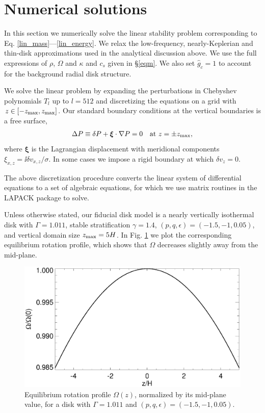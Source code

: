 \section{Numerical solutions}\label{numerical}
In this section we numerically solve the linear stability problem
corresponding to Eq. \ref{lin_mass}---\ref{lin_energy}. 
We relax the  low-frequency, nearly-Keplerian and thin-disk 
approximations used in the analytical discussion above. We 
use the full expressions of $\rho$, $\Omega$ and 
$\kappa$ and $c_s$ given in \S\ref{eqm}. We also set $\hat{g}_c=1$ to  
account for the background radial disk structure.  

We solve the linear problem by expanding the
perturbations in Chebyshev polynomials $T_l$ up to $l=512$
and discretizing the equations on a grid with
$z\in[-z_\mathrm{max},z_\mathrm{max}]$. Our standard boundary conditions at the vertical
boundaries is a free surface, 
\begin{align}
  \Delta P \equiv \delta P + \bm{\xi}\cdot\nabla P= 0 \quad \text{at } z=\pm z_\mathrm{max},
\end{align}
where $\bm{\xi}$ is the Lagrangian displacement with meridional 
components $\xi_{x,z} = \ii\delta v_{x,z}/\sigma$. In some cases we
impose a rigid boundary at which $\delta v_z=0$. 

The above discretization procedure
converts the linear system of differential equations to a set of 
algebraic equations, for which we use matrix routines in the LAPACK
package to solve. 

Unless otherwise stated, our fiducial disk model is a nearly 
vertically isothermal disk with $\Gamma=1.011$, stable
stratification $\gamma=1.4$, $(p,q,\epsilon)=(-1.5,-1,0.05)$, and 
vertical domain size $z_\mathrm{max}=5H$. In Fig. \ref{omega_z} we plot the
corresponding equilibrium rotation profile, which shows that $\Omega$
decreases slightly away from the mid-plane.  

\begin{figure}
  \includegraphics[width=\linewidth,clip=true,trim=0cm 0cm 0cm
  0cm]{figures/omega2} 
  \caption{Equilibrium rotation profile $\Omega(z)$,
    normalized by its mid-plane value, for a disk with $\Gamma=1.011$
    and $(p,q,\epsilon)=(-1.5,-1,0.05)$. 
    \label{omega_z} 
  }
\end{figure}




